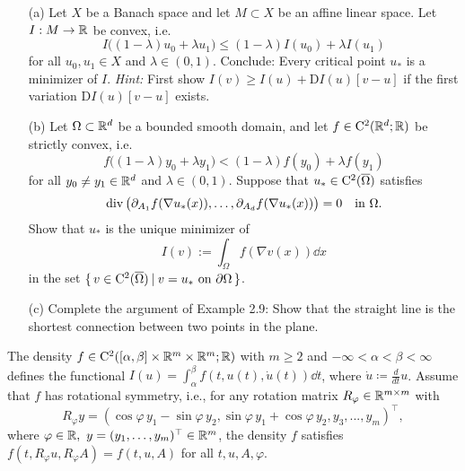 \documentclass[12pt,a4paper]{article}
\begin{document}

\setcounter{AUFGABE}{6}

\begin{itemize}
\item[(a)]
Let $X$ be a Banach space and let $M\subset X$ be an affine linear space.
Let
$I:M\to{\mathbb R}$ be convex, i.e.
\[
I\big((1{-}\lambda)u_0 + \lambda u_1\big)\leq (1{-}\lambda)I(u_0)+ \lambda I(u_1)
\]
for all $u_0,u_1\in X$ and $\lambda\in(0,1)$.
Conclude: Every critical  point $u_\ast$ is a minimizer of $I$.
\textit{Hint:} First show 
$I(v)\geq I(u)+ \mathrm{D}I(u)[v{-}u]$
if the first variation $\mathrm{D}I(u)[v{-}u]$ exists.
\item[(b)]
Let $\Omega\subset{\mathbb R}^d$ be a bounded smooth domain,
and let $f\in{\mathrm C}^2({\mathbb R}^d;{\mathbb R})$ be strictly convex, i.e.
\[
f\big((1{-}\lambda)y_0 + \lambda y_1\big)< (1{-}\lambda)f(y_0)+ \lambda f(y_1)
\]
for all $y_0\neq y_1\in {\mathbb R}^d$ and $\lambda\in(0,1)$.
Suppose that $u_\ast\in{\mathrm C}^2(\overline{\Omega})$
satisfies 
\[
\mathop{\mathrm{div}}\nolimits\big(\partial_{A_1} f(\nabla u_\ast(x)),\dots,\partial_{A_d}f(\nabla u_\ast(x))\big)=0
\quad\text{in }\Omega.
\]
Show that $u_\ast$ is the unique minimizer of 
\[
I(v):=\int_\Omega f(\nabla v(x))\dd x
\]
in the set $\{\, v\in {\mathrm C}^2(\overline\Omega) \: | \: v=u_\ast \text{ on } \partial\Omega \,\}$.
\item[(c)]
Complete the argument of Example 2.9:
Show that the straight line is the shortest connection between two points in the plane.
\end{itemize}

The
density $f\in {\mathrm C}^2([\alpha,\beta]\times{\mathbb R}^m\times{\mathbb R}^m;{\mathbb R})$ with
$m\geq 2$ and $-\infty<\alpha<\beta<\infty$ defines
the functional  $I(u)=\int_{\alpha}^{\beta} f(t,u(t),\dot{u}(t))\dd t$,
where $\dot u \coloneqq \frac{d}{dt}u$.
Assume that $f$ has rotational symmetry, i.e.,
for any rotation matrix  $R_{\varphi}\in{\mathbb R}^{m\times{}m}$ with 
\[
R_{\varphi}y= ( \cos\varphi \,y_1 -\sin\varphi\, y_2,
\sin\varphi\, y_1 + \cos\varphi\, y_2,y_3,..., y_m)^\top,
\]
where $\varphi\in\R,\ y=(y_1,\ldots,y_m)^\top\in \R^m$,
the density $f$ satisfies  
$f(t,R_\varphi{}u,R_\varphi{}A)=f(t,u,A)$ for all $t,u,A,\varphi$.
\end{document}
